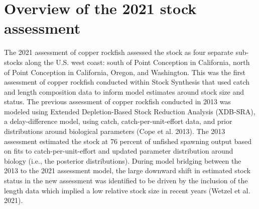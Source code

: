 \documentclass[11pt,
  english,
  a4paper,
]{article}
\begin{document}
\leavevmode\tagmcend\tagstructend\par


\hypertarget{overview-of-the-2021-stock-assessment}{%
\section{Overview of the 2021 stock assessment}\label{overview-of-the-2021-stock-assessment}}

\leavevmode\tagmcend\tagstructend


The 2021 assessment of copper rockfish assessed the stock as four separate sub-stocks along the U.S. west coast: south of Point Conception in California, north of Point Conception in California, Oregon, and Washington. This was the first assessment of copper rockfish conducted within Stock Synthesis that used catch and length composition data to inform model estimates around stock size and status. The previous assessment of copper rockfish conducted in 2013 was modeled using Extended Depletion-Based Stock Reduction Analysis (XDB-SRA), a delay-difference model, using catch, catch-per-unit-effort data, and prior distributions around biological parameters {(Cope et al. 2013)\leavevmode\tagmcend\tagstructend}. The 2013 assessment estimated the stock at 76 percent of unfished spawning output based on fits to catch-per-unit-effort and updated parameter distribution around biology (i.e., the posterior distributions). During model bridging between the 2013 to the 2021 assessment model, the large downward shift in estimated stock status in the new assessment was identified to be driven by the inclusion of the length data which implied a low relative stock size in recent years {(Wetzel et al. 2021)\leavevmode\tagmcend\tagstructend}.

\leavevmode\tagmcend\tagstructend\par

\end{document}
